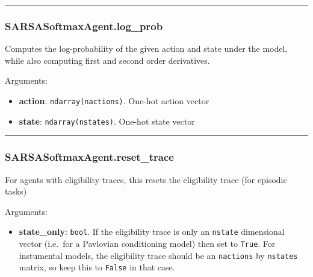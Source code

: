 \begin{center}\rule{0.5\linewidth}{\linethickness}\end{center}

\subsubsection{SARSASoftmaxAgent.log\_prob}\label{sarsasoftmaxagent.log_prob}

\begin{Shaded}
\begin{Highlighting}[]
\end{Highlighting}
\end{Shaded}

Computes the log-probability of the given action and state under the
model, while also computing first and second order derivatives.

Arguments:

\begin{itemize}
\tightlist
\item
  \textbf{action}: \texttt{ndarray(nactions)}. One-hot action vector
\item
  \textbf{state}: \texttt{ndarray(nstates)}. One-hot state vector
\end{itemize}

\begin{center}\rule{0.5\linewidth}{\linethickness}\end{center}

\subsubsection{SARSASoftmaxAgent.reset\_trace}\label{sarsasoftmaxagent.reset_trace}

\begin{Shaded}
\begin{Highlighting}[]
\OperatorTok{=}\NormalTok{)}
\end{Highlighting}
\end{Shaded}

For agents with eligibility traces, this resets the eligibility trace
(for episodic tasks)

Arguments:

\begin{itemize}
\tightlist
\item
  \textbf{state\_only}: \texttt{bool}. If the eligibility trace is only
  an \texttt{nstate} dimensional vector (i.e.~for a Pavlovian
  conditioning model) then set to \texttt{True}. For instumental models,
  the eligibility trace should be an \texttt{nactions} by
  \texttt{nstates} matrix, so keep this to \texttt{False} in that case.
\end{itemize}

